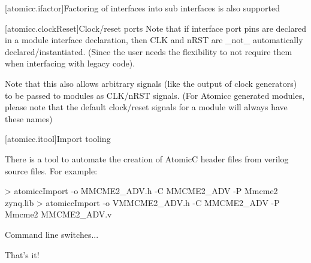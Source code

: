 [atomicc.ifactor]{Factoring of interfaces into sub interfaces is also supported}

[atomicc.clockReset]{Clock/reset ports}
Note that if interface port pins are declared in a module interface declaration, then
CLK and nRST are _not_ automatically declared/instantiated.  (Since the user needs the
flexibility to not require them when interfacing with legacy code).

Note that this also allows arbitrary signals (like the output of clock generators) to be
passed to modules as CLK/nRST signals.  (For Atomicc generated modules, please note that the
default clock/reset signals for a module will always have these names)

[atomicc.itool]{Import tooling}

There is a tool to automate the creation of AtomicC header files from verilog source files.
For example:
\begin{codeblock}
>        atomiccImport -o MMCME2_ADV.h -C MMCME2_ADV -P Mmcme2 zynq.lib
>        atomiccImport -o VMMCME2_ADV.h -C MMCME2_ADV -P Mmcme2 MMCME2_ADV.v
\end{codeblock}

Command line switches...

That's it!
